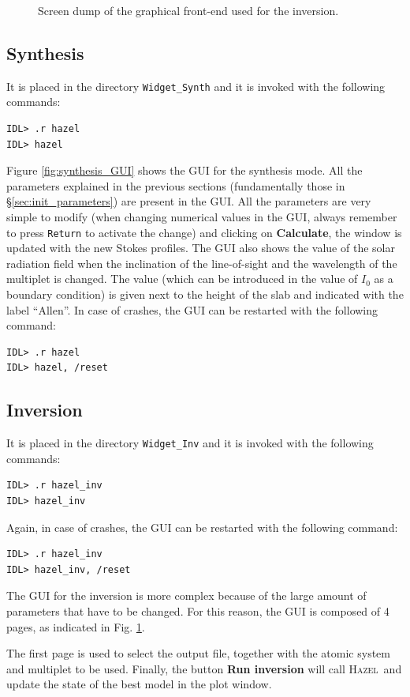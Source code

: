 \documentclass[12pt]{article}
\def\H{\textsc{Hazel}}
\begin{document}
\begin{figure}[!t]
\caption{Screen dump of the graphical front-end used for the inversion.
\label{fig:inversion_GUI}}
\end{figure}


\subsection{Synthesis}
It is placed in the directory \texttt{Widget\_Synth} and it is invoked with the following commands:
\begin{verbatim}
IDL> .r hazel
IDL> hazel 
\end{verbatim}
Figure \ref{fig:synthesis_GUI} shows the GUI for the synthesis mode. All the parameters explained in
the previous sections (fundamentally those in \S\ref{sec:init_parameters}) are present in the
GUI. All the parameters are very simple to modify (when changing numerical values in the
GUI, always remember to press \texttt{Return} to activate the change) and clicking on \textbf{Calculate},
the window is updated with the new Stokes profiles.
The GUI also shows the value of the solar radiation field when the inclination of the line-of-sight
and the wavelength of the multiplet is changed. The value (which can be introduced in the
value of $I_0$ as a boundary condition) is given next to the height of the slab and
indicated with the label ``Allen''. In case of crashes, the GUI can be restarted with the following
command:
\begin{verbatim}
IDL> .r hazel
IDL> hazel, /reset
\end{verbatim}

\subsection{Inversion}
It is placed in the directory \texttt{Widget\_Inv} and it is invoked with the following commands:
\begin{verbatim}
IDL> .r hazel_inv
IDL> hazel_inv
\end{verbatim}
Again, in case of crashes, the GUI can be restarted with the following command:
\begin{verbatim}
IDL> .r hazel_inv
IDL> hazel_inv, /reset
\end{verbatim}
The GUI for the inversion is more complex because of the large amount of parameters that have
to be changed. For this reason, the GUI is composed of 4 pages, as indicated in 
Fig. \ref{fig:inversion_GUI}. 

The first page is used to select the output file, together with the 
atomic system and multiplet to be used. Finally, the button \textbf{Run inversion} will call
\H\ and update the state of the best model in the plot window.
\end{document}
